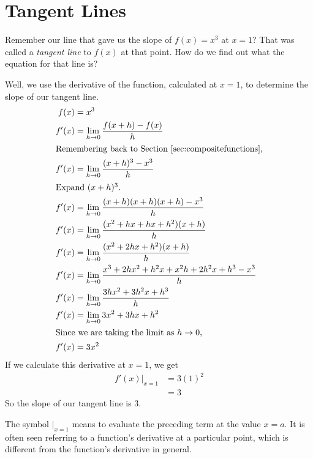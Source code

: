 \section{Tangent Lines}

Remember our line that gave us the slope of $f(x)=x^3$ at $x=1$?
That was called a \emph{tangent line} to $f(x)$ at that point.
How do we find out what the equation for that line is?

Well, we use the derivative of the function, calculated at $x=1$, to determine the slope of our tangent line.
\begin{align*}
  f(x)&=x^3\\
  f'(x)&=\lim_{h \to 0} \frac{f(x+h)-f(x)}{h} \\
  \intertext{Remembering back to Section \ref{sec:compositefunctions},}
  f'(x)&=\lim_{h \to 0} \frac{(x+h)^3-x^3}{h} \\
  \intertext{Expand $(x+h)^3$.}
  f'(x)&=\lim_{h \to 0} \frac{(x+h)(x+h)(x+h)-x^3}{h} \\
  f'(x)&=\lim_{h \to 0} \frac{(x^2+hx+hx+h^2)(x+h)}{h} \\
  f'(x)&=\lim_{h \to 0} \frac{(x^2+2hx+h^2)(x+h)}{h} \\
  f'(x)&=\lim_{h \to 0} \frac{x^3+2hx^2+h^2x+x^2h+2h^2x+h^3-x^3}{h} \\
  f'(x)&=\lim_{h \to 0} \frac{3hx^2+3h^2x+h^3}{h} \\
  f'(x)&=\lim_{h \to 0} 3x^2+3hx+h^2 \\
  \intertext{Since we are taking the limit as $h\to0$,}
  f'(x)&=3x^2
\end{align*}
If we calculate this derivative at $x=1$, we get
\begin{align*}
  f'(x)\Big|_{x=1}&=3(1)^2 \\
  &=3
\end{align*}
So the slope of our tangent line is $3$.
\begin{note}
  The symbol $\big|_{x=1}$ means to evaluate the preceding term at the value $x=a$.
  It is often seen referring to a function's derivative at a particular point, which is different from the function's derivative in general.
\end{note}

